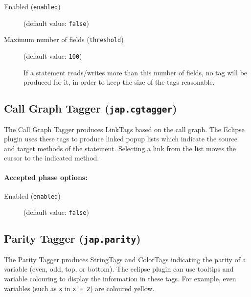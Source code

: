 \documentclass{article}
\begin{document}
\begin{description}

\item[Enabled ({\tt enabled})]
(default value: {\tt false})






\item[Maximum number of fields ({\tt threshold})]
(default value: {\tt 100})




If a statement reads/writes more than this number of fields, no tag will be
produced for it, in order to keep the size of the tags reasonable.
                        


\end{description}

\subsection{Call Graph Tagger ({\tt jap.cgtagger})}

The Call Graph Tagger produces LinkTags based on the call
graph. The Eclipse plugin uses these tags to produce
linked popup lists which indicate the source and target methods
of the statement. Selecting a link from the list moves the
cursor to the indicated method.


\paragraph{Accepted phase options:} 

\begin{description}

\item[Enabled ({\tt enabled})]
(default value: {\tt false})






\end{description}

\subsection{Parity Tagger ({\tt jap.parity})}

The Parity Tagger produces StringTags and ColorTags indicating
the parity of a variable (even, odd, top, or bottom).  The eclipse
plugin can use tooltips and variable colouring to display the
information in these tags.  For example, even variables (such as
{\tt x} in {\tt x = 2}) are coloured yellow.
\end{document}

